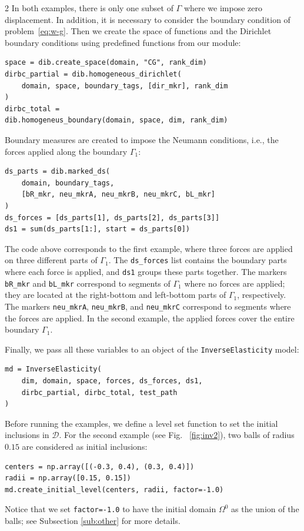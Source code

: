 \documentclass[a4paper, oneside]{article}
\newcommand{\code}[1]{\texttt{#1}}
\begin{document}
\begin{multicols}{2}
In both examples, there is only one subset of $\Gamma$ where
we impose zero displacement. In addition, it is necessary to consider the 
boundary condition of problem~\eqref{eq:w-g}.  
Then we create the space of functions and the Dirichlet boundary conditions
using predefined functions from our module:
\begin{lstlisting}
space = dib.create_space(domain, "CG", rank_dim)
dirbc_partial = dib.homogeneous_dirichlet(
	domain, space, boundary_tags, [dir_mkr], rank_dim
)
dirbc_total =
dib.homogeneus_boundary(domain, space, dim, rank_dim)
\end{lstlisting}

Boundary measures are created to impose the Neumann conditions, i.e.,
the forces applied along the boundary $\Gamma_1$:
\begin{lstlisting}
ds_parts = dib.marked_ds(
	domain, boundary_tags,
	[bR_mkr, neu_mkrA, neu_mkrB, neu_mkrC, bL_mkr]
)
ds_forces = [ds_parts[1], ds_parts[2], ds_parts[3]] 
ds1 = sum(ds_parts[1:], start = ds_parts[0])
\end{lstlisting}
The code above corresponds to the first example, where three forces are applied
on three different parts of $\Gamma_1$.
The \code{ds\_forces} list contains the boundary parts where each force is applied, 
and \code{ds1} groups these parts together.
The markers \code{bR\_mkr} and \code{bL\_mkr} correspond to segments of $\Gamma_1$ where
no forces are applied;
they are located at the right-bottom and left-bottom parts of $\Gamma_1$, respectively. 
The markers \code{neu\_mkrA}, \code{neu\_mkrB}, and \code{neu\_mkrC}
correspond to segments where the forces are applied.
In the second example, the applied forces cover the entire boundary $\Gamma_1$.

Finally, we pass all these variables to an object of the \code{InverseElasticity} model:
\begin{lstlisting}
md = InverseElasticity(
	dim, domain, space, forces, ds_forces, ds1,
	dirbc_partial, dirbc_total, test_path
)
\end{lstlisting}
Before running the examples, we define a level set function to set
the initial inclusions in $\mathcal{D}$.
For the second example (see Fig. ~\ref{fig:inv2}), two balls of radius $0.15$ are considered as initial inclusions:
\begin{lstlisting}
centers = np.array([(-0.3, 0.4), (0.3, 0.4)])
radii = np.array([0.15, 0.15])
md.create_initial_level(centers, radii, factor=-1.0)
\end{lstlisting}
Notice that we set \code{factor=-1.0} to have the initial domain $\Omega^0$
as the union of the balls; see Subsection \ref{sub:other} for more details.


\end{multicols}
\end{document}
